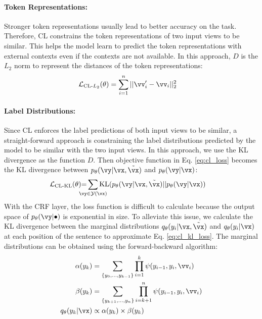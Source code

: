 \documentclass[11pt,a4paper]{article}
\newcommand{\mcL}{\mathcal{L}}
\newcommand{\mcY}{\mathcal{Y}}
\begin{document}
\paragraph{Token Representations:} Stronger token representations usually lead to better accuracy on the task. Therefore, CL constrains the token representations of two input views to be similar. This helps the model learn to predict the token representations with external contexts even if the contexts are not available. In this approach, $D$ is the $L_2$ norm to represent the distances of the token representations:
\begin{align}
\mcL_{\text{CL-$L_2$}}(\theta)&=\sum_{i=1}^n||\vv_{i}^{\prime}-\vv_{i}||_2^2 \label{eq:L2_loss}
\end{align}

\paragraph{Label Distributions:} Since CL enforces the label predictions of both input views to be similar, a straight-forward approach is constraining the label distributions predicted by the model to be similar with the two input views. In this approach, we use the KL divergence as the function $D$. Then objective function in Eq. \ref{eq:cl_loss} becomes the KL divergence between $p_\theta(\vy|\vx, \tilde{\vx})$ and $p_\theta(\vy|\vx)$:
\begin{align}
\mcL_{\text{CL-KL}}(\theta)&{=}\sum_{\mathclap{\vy \in \mcY(\vx)}} \text{KL}(p_\theta(\vy|\vx, \tilde{\vx})||p_\theta(\vy|\vx)) \label{eq:cl_kl_loss}
\end{align}
With the CRF layer, the loss function is difficult to calculate because the output space of $p_\theta(\vy|\bullet)$ is exponential in size. To alleviate this issue, we calculate the KL divergence between the marginal distributions $q_\theta(y_i|\vx,\tilde{\vx})$ and $q_\theta(y_i|\vx)$ at each position of the sentence to approximate Eq. \ref{eq:cl_kl_loss}. The marginal distributions can be obtained using the forward-backward algorithm:
\begin{align}
\alpha(y_k)&=\sum\limits_{\{y_0,\dots,y_{k-1}\}} \prod\limits_{i=1}^{k} \psi(y_{i-1}, y_i, \vv_i)\nonumber\\
\beta(y_k) &= \sum\limits_{\{y_{k+1},\dots,y_n\}} \prod\limits_{i=k+1}^{n} \psi(y_{i-1}, y_i, \vv_i)\nonumber\\
q_\theta(y_k|\vx)
&\propto \alpha(y_k) \times \beta(y_k) \label{eq:posterior}  %
\end{align}
\end{document}

